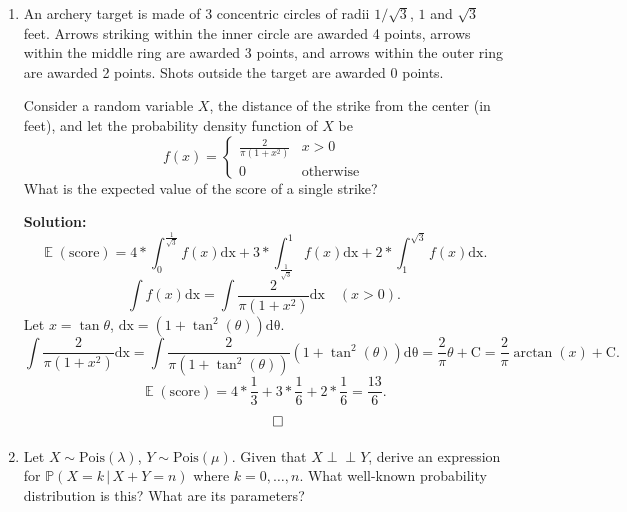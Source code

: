 \documentclass{article}
\DeclareMathOperator{\E}{\mathbb{E}}
\newenvironment{solution}{\color{blue} \smallskip \textbf{Solution:}}{}
\begin{document}
\begin{enumerate}
\begin{solution}
        Set this greater than $0.5$:
        \[
        \frac{x}{x + 999y} > 0.5
        \implies x > 0.5(x + 999y)
        \implies x > 999y.
        \]

        Therefore, the minimum value $x$ must have is: $x > 999y$.
        \[ \qedhere\]
    \end{solution}

    \item
    An archery target is made of 3 concentric circles of radii $1/{\sqrt{3}}$, $1$ and $\sqrt{3}$ feet. 
    Arrows striking within the inner circle are awarded 4 points, arrows within the middle ring are awarded 3 points, and arrows within the outer ring are awarded 2 points. 
    Shots outside the target are awarded 0 points.

    Consider a random variable $X$, the distance of the strike from the center (in feet), and let the probability density function of $X$ be
    \[
        f(x) = \begin{cases} \frac{2}{\pi (1+x^2)} & x>0 \\ 0 & \text{otherwise} \end{cases}
    \]
    What is the expected value of the score of a single strike?

    \begin{solution}
        $$
        \E(\text{score}) = 4 * \int_{0}^{\frac{1}{\sqrt{3}}} f(x) \mathrm{dx}
        + 3 * \int_{\frac{1}{\sqrt{3}}}^{1}  f(x) \mathrm{dx}
        + 2 * \int_{1}^{\sqrt{3}}  f(x) \mathrm{dx}.
        $$
        $$
        \int f(x) \mathrm{dx} = \int \frac{2}{\pi (1+x^2)} \mathrm{dx} \quad (x > 0).
        $$
        Let $x = \tan \theta$, $\mathrm{dx} = (1+\tan^2(\theta)) \mathrm{d\theta}$.
        $$
        \int \frac{2}{\pi (1+x^2)} \mathrm{dx} = \int \frac{2}{\pi (1+\tan^2(\theta))} (1+\tan^2(\theta)) \mathrm{d\theta} = \frac{2}{\pi} \theta + \mathrm{C} = \frac{2}{\pi} \arctan(x) + \mathrm{C}.
        $$
        $$
        \E(\text{score}) = 4 * \frac{1}{3} + 3 * \frac{1}{6} + 2 * \frac{1}{6} = \frac{13}{6}.
        $$
        \[ \qedhere \]
    \end{solution}

    \item
    Let $X\sim \text{Pois}(\lambda)$, $Y\sim \text{Pois}(\mu)$. 
    Given that $X \perp \!\!\! \perp Y$, derive an expression for ${\mathbb{P}(X = k \,|\, X+Y=n)}$ where $k = 0, \dots, n$. 
    What well-known probability distribution is this? What are its parameters?


\end{enumerate}
\end{document}
